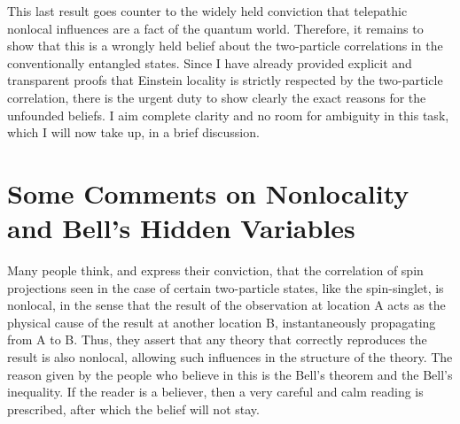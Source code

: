 This last result goes counter to the widely held conviction that telepathic nonlocal influences are a fact of the quantum world. Therefore, it remains to show that this is a wrongly held belief about the two-particle correlations in the conventionally entangled states. Since I have already provided explicit and transparent proofs that Einstein locality is strictly respected by the two-particle correlation, there is the urgent duty to show clearly the exact reasons for the unfounded beliefs. I aim complete clarity and no room for ambiguity in this task, which I will now take up, in a brief discussion.

\section{Some Comments on Nonlocality and Bell's Hidden Variables}%

Many people think, and express their conviction, that the correlation of spin projections
seen in the case of certain two-particle states, like the spin-singlet, is nonlocal, in the sense
that the result of the observation at location A acts as the physical cause of the result at
another location B, instantaneously propagating from A to B. Thus, they assert that any
theory that correctly reproduces the result is also nonlocal, allowing such influences in the
structure of the theory. The reason given by the people who believe in this is the Bell's
theorem and the Bell's inequality. If the reader is a believer, then a very careful and calm
reading is prescribed, after which the belief will not stay.



